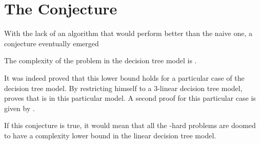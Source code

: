 \section{The Conjecture}

With the lack of an algorithm that would perform better than the naive
 one, a conjecture eventually emerged
\begin{conjecture}
The complexity of the \threeSUM problem in the decision tree model is
.
\end{conjecture}

It was indeed proved that this lower bound holds for a particular case of the
decision tree model. By restricting himself to a $3$-linear decision tree
model, \citet{erickson:1999} proves that \threeSUM is  in this
particular model. A second proof for this particular case is given by
\citet{ailon:2005}.

If this conjecture is true, it would mean that all the \threeSUM-hard
problems are doomed to have a  complexity lower bound in the
linear decision tree model.

